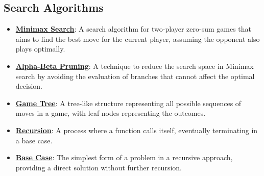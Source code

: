 \documentclass{article}%
\begin{document}
\subsection{Search Algorithms}%
\label{subsec:SearchAlgorithms}%
\begin{itemize}[leftmargin=*]%
\item \href{https://purdue.brightspace.com/d2l/common/assets/pdfjs-d2l-dist/1.0.14-legacy/web/viewer.html?file=\%2Fcontent\%2Fenforced\%2F1095467-wl.202510.CS.24300.001\%2F02L2-Intro.pdf\%3Fou\%3D1095467\&lang=en-us\&container=d2l-fileviewer-rendered-pdf\&fullscreen=d2l-fileviewer-rendered-pdf-dialog\&height=667#page=22}{\textbf{Minimax Search}}: A search algorithm for two-player zero-sum games that aims to find the best move for the current player, assuming the opponent also plays optimally.%
\item \href{https://purdue.brightspace.com/d2l/common/assets/pdfjs-d2l-dist/1.0.14-legacy/web/viewer.html?file=\%2Fcontent\%2Fenforced\%2F1095467-wl.202510.CS.24300.001\%2F02L2-Intro.pdf\%3Fou\%3D1095467\&lang=en-us\&container=d2l-fileviewer-rendered-pdf\&fullscreen=d2l-fileviewer-rendered-pdf-dialog\&height=667#page=23}{\textbf{Alpha-Beta Pruning}}: A technique to reduce the search space in Minimax search by avoiding the evaluation of branches that cannot affect the optimal decision.%
\item \href{https://purdue.brightspace.com/d2l/common/assets/pdfjs-d2l-dist/1.0.14-legacy/web/viewer.html?file=\%2Fcontent\%2Fenforced\%2F1095467-wl.202510.CS.24300.001\%2F02L2-Intro.pdf\%3Fou\%3D1095467\&lang=en-us\&container=d2l-fileviewer-rendered-pdf\&fullscreen=d2l-fileviewer-rendered-pdf-dialog\&height=667#page=11}{\textbf{Game Tree}}: A tree-like structure representing all possible sequences of moves in a game, with leaf nodes representing the outcomes.%
\item \href{https://purdue.brightspace.com/d2l/common/assets/pdfjs-d2l-dist/1.0.14-legacy/web/viewer.html?file=\%2Fcontent\%2Fenforced\%2F1095467-wl.202510.CS.24300.001\%2F14L1-DepthFS.pdf\%3Fou\%3D1095467\&lang=en-us\&container=d2l-fileviewer-rendered-pdf\&fullscreen=d2l-fileviewer-rendered-pdf-dialog\&height=667#page=2}{\textbf{Recursion}}: A process where a function calls itself, eventually terminating in a base case.%
\item \href{https://purdue.brightspace.com/d2l/common/assets/pdfjs-d2l-dist/1.0.14-legacy/web/viewer.html?file=\%2Fcontent\%2Fenforced\%2F1095467-wl.202510.CS.24300.001\%2F14L1-DepthFS.pdf\%3Fou\%3D1095467\&lang=en-us\&container=d2l-fileviewer-rendered-pdf\&fullscreen=d2l-fileviewer-rendered-pdf-dialog\&height=667#page=5}{\textbf{Base Case}}: The simplest form of a problem in a recursive approach, providing a direct solution without further recursion.%

\end{itemize}
\end{document}
